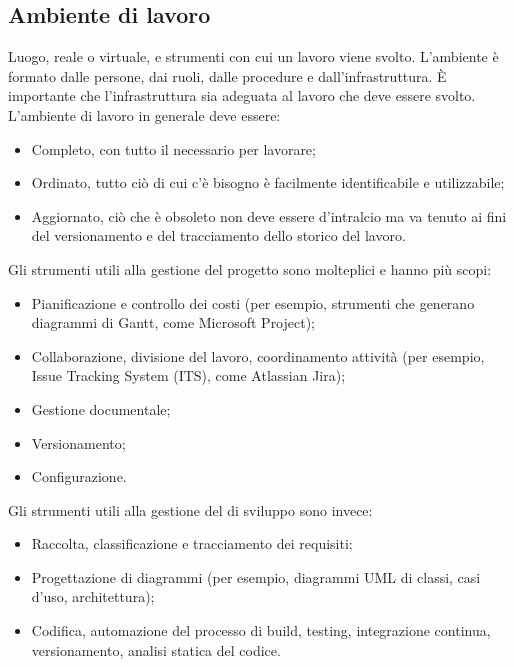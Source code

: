 \documentclass[../main]{subfiles}
\begin{document}
\subsection{Ambiente di lavoro}
Luogo, reale o virtuale, e strumenti con cui un lavoro viene svolto. L'ambiente è formato dalle persone, dai ruoli, dalle procedure e dall'infrastruttura.
È importante che l'infrastruttura sia adeguata al lavoro che deve essere svolto. L'ambiente di lavoro in generale deve essere:
\begin{itemize}
    \item Completo, con tutto il necessario per lavorare;
    \item Ordinato, tutto ciò di cui c'è bisogno è facilmente identificabile e utilizzabile;
    \item Aggiornato, ciò che è obsoleto non deve essere d'intralcio ma va tenuto ai fini del versionamento e del tracciamento dello storico del lavoro.
\end{itemize}
Gli strumenti utili alla gestione del progetto sono molteplici e hanno più scopi:
\begin{itemize}
    \item Pianificazione e controllo dei costi (per esempio, strumenti che generano diagrammi di Gantt, come Microsoft Project);
    \item Collaborazione, divisione del lavoro, coordinamento attività (per esempio, Issue Tracking System (ITS), come Atlassian Jira);
    \item Gestione documentale;
    \item Versionamento;
    \item Configurazione.
\end{itemize}
Gli strumenti utili alla gestione del  di sviluppo sono invece:
\begin{itemize}
    \item Raccolta, classificazione e tracciamento dei requisiti;
    \item Progettazione di diagrammi (per esempio, diagrammi UML di classi, casi d'uso, architettura);
    \item Codifica, automazione del processo di build, testing, integrazione continua, versionamento, analisi statica del codice.
\end{itemize}
\end{document}
